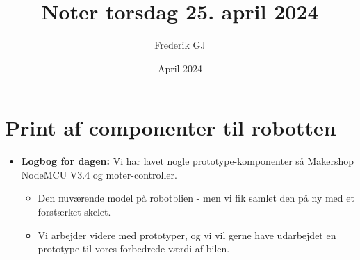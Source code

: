 \documentclass{article}
\title{Noter torsdag 25. april 2024}
\author{Frederik GJ}
\date{April 2024}
\begin{document}
\maketitle

\section{Print af componenter til robotten}

\begin{itemize}
    \item \textbf{Logbog for dagen:} Vi har lavet nogle prototype-komponenter så Makershop NodeMCU V3.4 og moter-controller. 
    \begin{itemize}
        \item Den nuværende model på robotblien - men vi fik samlet den på ny med et forstærket skelet. 
        \item Vi arbejder videre med prototyper, og vi vil gerne have udarbejdet en prototype til vores forbedrede værdi af bilen. 
    \end{itemize}
\end{itemize}
\end{document}
